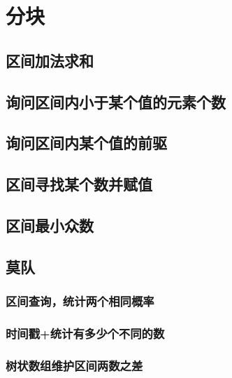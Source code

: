 \documentclass[twoside,a4paper]{article}
\begin{document}
\section{分块}

\subsection{区间加法求和}


\subsection{询问区间内小于某个值的元素个数}


\subsection{询问区间内某个值的前驱}


\subsection{区间寻找某个数并赋值}


\subsection{区间最小众数}


\subsection{莫队}

\subsubsection{区间查询，统计两个相同概率}

\subsubsection{时间戳+统计有多少个不同的数}

\subsubsection{树状数组维护区间两数之差}

\end{document}
